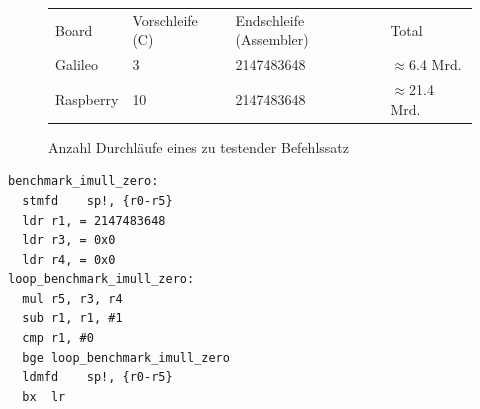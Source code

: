 \begin{figure}[H]
\center
\begin{tabular}{ |l|l|l|l| }
\hline
Board & Vorschleife (C) & Endschleife (Assembler) & Total \\ \hhline{|=|=|=|=|}
Galileo & 3 & 2147483648 & $\approx$6.4 Mrd.  \\ \hline
Raspberry & 10 & 2147483648 & $\approx$21.4 Mrd. \\ \hline
\end{tabular}
\caption{Anzahl Durchläufe eines zu testender Befehlssatz}
\label{fig:benchmark_loop_size}
\end{figure}



\begin{minipage}{\linewidth}
\lstset{language=[x64]Assembler}
\begin{lstlisting}[label={list:asm_benchmark},caption={Benchmark in Assembler}]
benchmark_imull_zero:
  stmfd    sp!, {r0-r5}
  ldr r1, = 2147483648
  ldr r3, = 0x0
  ldr r4, = 0x0
loop_benchmark_imull_zero:
  mul r5, r3, r4
  sub r1, r1, #1
  cmp r1, #0
  bge loop_benchmark_imull_zero
  ldmfd    sp!, {r0-r5}
  bx  lr
\end{lstlisting}
\end{minipage}


